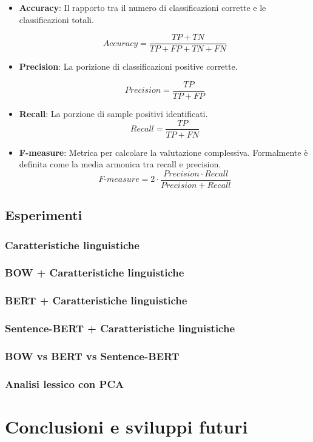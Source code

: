 \documentclass[oneside]{book}
\begin{document}
\begin{itemize}
	\item \textbf{Accuracy}: Il rapporto tra il numero di classificazioni corrette e le classificazioni totali.
	
	$$Accuracy = \frac{TP + TN}{TP + FP + TN + FN} $$
	
	\item \textbf{Precision}: La porizione di classificazioni positive corrette.
	
	$$Precision = \frac{TP}{TP + FP} $$
		
	\item \textbf{Recall}: La porzione di sample positivi identificati.
	$$Recall = \frac{TP}{TP + FN} $$
	
	
	\item \textbf{F-measure}: Metrica per calcolare la valutazione complessiva. Formalmente è definita come la media armonica tra recall e precision.
	$$F\text{-}measure =  2 \cdot \frac{Precision \cdot Recall}{Precision + Recall} $$
	
\end{itemize}

\section{Esperimenti}

\subsection{Caratteristiche linguistiche}
\subsection{BOW + Caratteristiche linguistiche}
\subsection{BERT + Caratteristiche linguistiche}
\subsection{Sentence-BERT + Caratteristiche linguistiche}
\subsection{BOW vs BERT vs Sentence-BERT}
\subsection{Analisi lessico con PCA}


\chapter{Conclusioni e sviluppi futuri}
\end{document}
